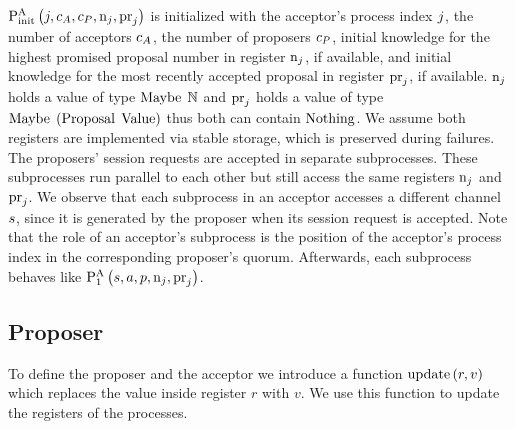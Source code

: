$\operatorname{P^{A}_{init}}\left(
    j,
    c_A,
    c_P,
    \operatorname{n}_{j},
    \operatorname{pr}_{j}
\right)$ is initialized with the acceptor's process index $j$, the number of acceptors $c_A$, the number of proposers $c_P$, initial knowledge for the highest promised proposal number in register $\operatorname{n}_{j}$, if available, and initial knowledge for the most recently accepted proposal in register $\operatorname{pr}_{j}$, if available.
$\operatorname{n}_{j}$ holds a value of type $\operatorname{Maybe}\; \mathbb{N}$ and $\operatorname{pr}_{j}$ holds a value of type $\operatorname{Maybe}\; \left(\operatorname{Proposal}\; \operatorname{Value}\right)$ thus both can contain $\operatorname{Nothing}$.
We assume both registers are implemented via stable storage, which is preserved during failures.
The proposers' session requests are accepted in separate subprocesses.
These subprocesses run parallel to each other but still access the same registers $\operatorname{n}_{j}$ and $\operatorname{pr}_{j}$.
We observe that each subprocess in an acceptor accesses a different channel $s$, since it is generated by the proposer when its session request is accepted.
Note that the role of an acceptor's subprocess is the position of the acceptor's process index in the corresponding proposer's quorum.
Afterwards, each subprocess behaves like $\operatorname{P^{A}_{1}}\left(
    s,
    a,
    p,
    \operatorname{n}_{j},
    \operatorname{pr}_{j}
\right)$.

\subsection{Proposer}
To define the proposer and the acceptor we introduce a function $\operatorname{update} \left(r, v\right)$ which replaces the value inside register $r$ with $v$.
We use this function to update the registers of the processes.

